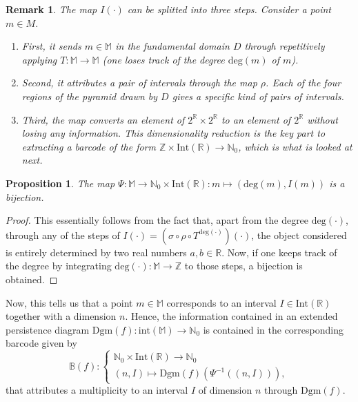 \documentclass[11pt]{article}
\newtheorem{proposition}[theorem]{Proposition}
\newtheorem{remark}[theorem]{Remark}
\theoremstyle{remark}
\newcommand{\Z}{\mathbb{Z}}
\newcommand{\N}{\mathbb{N}}
\newcommand{\R}{\mathbb{R}}
\newcommand{\M}{\mathbb{M}}
\begin{document}
\begin{remark}
The map $I(\cdot)$ can be splitted into three steps. Consider a point $m\in M$. 
\begin{enumerate}
    \item[$\bullet$] First, it sends $m\in\M$ in the fundamental domain $D$ through repetitively applying $T:\M\rightarrow\M$ (one loses track of the degree $\mathrm{deg}(m)$ of $m$).
    \item[$\bullet$] Second, it attributes a pair of intervals through the map $\rho$. Each of the four regions of the pyramid drawn by $D$ gives a specific kind of pairs of intervals.
    \item[$\bullet$] Third, the map converts an element of $2^\R\times 2^\R$ to an element of $2^\R$ without losing any information. This dimensionality reduction is the key part to extracting a barcode of the form $\Z\times\mathrm{Int}(\R)\rightarrow\N_0$, which is what is looked at next.
\end{enumerate} 
\end{remark}

\begin{proposition}
The map $\Psi:\M\rightarrow \N_0\times\mathrm{Int}(\R):m\mapsto (\mathrm{deg}(m),I(m))$ is a bijection.
\end{proposition}

\begin{proof}
This essentially follows from the fact that, apart from the degree $\mathrm{deg}(\cdot)$, through any of the steps of $I(\cdot)=(\sigma\circ \rho\circ T^{\mathrm{deg}(\cdot)})(\cdot)$, the object considered is entirely determined by two real numbers $a,b\in\R$. Now, if one keeps track of the degree by integrating $\mathrm{deg}(\cdot):\M\rightarrow\Z$ to those steps, a bijection is obtained.
\end{proof}

\noindent Now, this tells us that a point $m\in\M$ corresponds to an interval $I\in\mathrm{Int}(\R)$ together with a dimension $n$. Hence, the information contained in an extended persistence diagram $\mathrm{Dgm}(f):\mathrm{int}(\M)\rightarrow\N_0$ is contained in the corresponding barcode given by 
\begin{equation*}
    \mathbb{B}(f):
    \begin{cases}
    \N_0\times\mathrm{Int}(\R)\rightarrow\N_0\\
    (n,I)\mapsto \mathrm{Dgm}(f)(\Psi^{-1}((n,I))),
    \end{cases}
\end{equation*}
that attributes a multiplicity to an interval $I$ of dimension $n$ through $\mathrm{Dgm}(f)$. 
\end{document}

